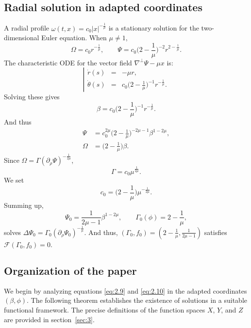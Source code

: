 \documentclass[11pt]{article}
\theoremstyle{definition}
\theoremstyle{remark}
\numberwithin{equation}{section}
\newcommand{\mcal}{\mathcal}
\newcommand{\del}{\partial}
\newcommand{\grad}{\nabla}
\begin{document}
\subsection{Radial solution in adapted coordinates} \label{subsec:2.1}
A radial profile $\omega(t,x) = c_0 |x|^{-\frac{1}{\mu}}$ is a stationary solution for the two-dimensional Euler equation. When $\mu \neq 1$,
\[\Omega = c_0 r^{-\frac{1}{\mu}}, \qquad \Psi = c_0 \Big(2 - \frac{1}{\mu}\Big)^{-2} r^{2 - \frac{1}{\mu}}.\]
The characteristic ODE for the vector field $\grad^\perp \Psi - \mu x$ is:
\begin{equation*} \left\vert \begin{array}{rcl}
\dot{r}(s) & = & -\mu r, \\ 
\dot{\theta}(s) &=& c_0 \Big(2 - \frac{1}{\mu} \Big)^{-1} r^{-\frac{1}{\mu}}.
\end{array} \right. \end{equation*}
Solving these gives
\[\beta = c_0 \Big( 2 - \frac{1}{\mu} \Big)^{-1} r^{-\frac{1}{\mu}}.\]
And thus
\begin{align*}
\Psi &= c_0^{2\mu} \Big(2 - \frac{1}{\mu} \Big)^{-2\mu - 1} \beta^{1-2\mu},\\
\Omega &= \Big( 2 - \frac{1}{\mu} \Big) \beta.
\end{align*}
Since $\Omega = \Gamma (\del_\rho\Psi)^{-\frac{1}{2\mu}}$,
\[\Gamma = c_0 \mu^{\frac{1}{2\mu}}.\]
We set
\[c_0 = \Big( 2 - \frac{1}{\mu} \Big) \mu^{-\frac{1}{2\mu}}.\]
Summing up,
\begin{equation*}
\Psi_0 = \frac{1}{2\mu - 1} \beta^{1-2\mu}, \qquad \Gamma_0(\phi) = 2 - \frac{1}{\mu},
\end{equation*}
solves $\Delta \Psi_0 = \Gamma_0 (\del_\rho \Psi_0)^{-\frac{1}{\mu}}$. And thus, $(\Gamma_0, f_0) = (2 - \frac{1}{\mu}, \frac{1}{2\mu - 1})$ satisfies $\mcal{F}(\Gamma_0, f_0) = 0$.

\subsection{Organization of the paper}
We begin by analyzing equations \eqref{eq:2.9} and \eqref{eq:2.10} in the adapted coordinates $(\beta,\phi)$. The following theorem establishes the existence of solutions in a suitable functional framework. The precise definitions of the function spaces $X$, $Y$, and $Z$ are provided in section~\ref{sec:3}.
\end{document}

